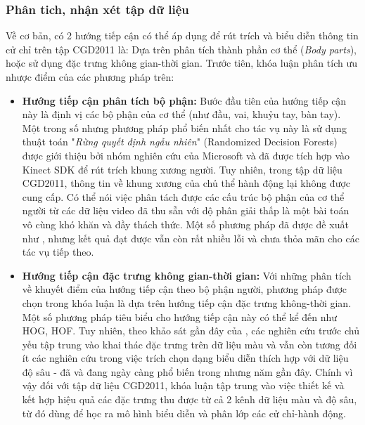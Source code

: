 \subsubsection{Phân tich, nhận xét tập dữ liệu}
Về cơ bản, có 2 hướng tiếp cận có thể áp dụng để rút trích và biểu diễn thông tin cử chỉ trên tập CGD2011 là: Dựa trên phân tích thành phần cơ thể (\textit{Body parts}), hoặc sử dụng đặc trưng không gian-thời gian. Trước tiên, khóa luận phân tích ưu nhược điểm của các phương pháp trên: 
\begin{itemize}
\item \textbf{Hướng tiếp cận phân tích bộ phận: } Bước đầu tiên của hướng tiếp cận này là định vị các bộ phận của cơ thể (như đầu, vai, khuỷu tay, bàn tay). Một trong số nhưng phương pháp phổ biến nhất cho tác vụ này là sử dụng thuật toán "\textit{Rừng quyết định ngẫu nhiên}" (Randomized Decision Forests) được giới thiệu bởi nhóm nghiên cứu của Microsoft \cite{JamieShotton_Pose_recognition} và đã được tích hợp vào Kinect SDK để rút trích khung xương người. Tuy nhiên, trong tập dữ liệu CGD2011, thông tin về khung xương của chủ thể hành động lại không được cung cấp. Có thể nói việc phân tách được các cấu trúc bộ phận của cơ thể người từ các dữ liệu video đã thu sẵn với độ phân giải thấp là một bài toán vô cùng khó khăn và đầy thách thức. Một số phương pháp đã được đề xuất như \cite{EichnerMZF12_IJCV}, nhưng kết quả đạt được vẫn còn rất nhiều lỗi và chưa thỏa mãn cho các tác vụ tiếp theo.
\item \textbf{Hướng tiếp cận đặc trưng không gian-thời gian:} Với những phân tích về khuyết điểm của hướng tiếp cận theo bộ phận người, phương pháp được chọn trong khóa luận là dựa trên hướng tiếp cận đặc trưng không-thời gian. \\
Một số phương pháp tiêu biểu cho hướng tiếp cận này có thể kể đến như HOG\cite{Dalal_HOG}, HOF\cite{Dalal_HOF}. Tuy nhiên, theo khảo sát gần đây của \cite{Aggarwal_HAR_Review}, các nghiên cứu trước chủ yếu tập trung vào khai thác đặc trưng trên dữ liệu màu và vẫn còn tương đối ít các nghiên cứu trong việc trích chọn dạng biểu diễn thích hợp với dữ liệu độ sâu - đã và đang ngày càng phổ biến trong nhưng năm gần đây. Chính vì vậy đối với tập dữ liệu CGD2011, khóa luận tập trung vào việc thiết kế và kết hợp hiệu quả các đặc trưng thu được từ cả 2 kênh dữ liệu màu và độ sâu, từ đó dùng để học ra mô hình biểu diễn và phân lớp các cử chỉ-hành động. 
\end{itemize}

